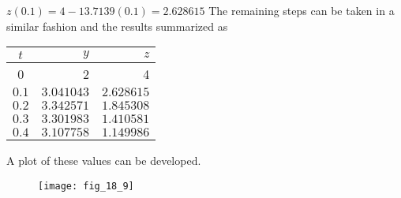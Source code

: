 \documentclass[../main.tex]{subfiles}
\begin{document}
\begin{enumerate}[label=\bfseries(\alph*)]
	\bigbreak
$z(0.1)=4-13.7139(0.1)=2.628615$
	\bigbreak
The remaining steps can be taken in a similar fashion and the results summarized as
	\bigbreak
\begin{tabular}{crr}
\hline
$t$ & $y$ & $z$ \\
\hline
0 & 2 & 4 \\
$0.1$ & $3.041043$ & $2.628615$ \\
$0.2$ & $3.342571$ & $1.845308$ \\
$0.3$ & $3.301983$ & $1.410581$ \\
$0.4$ & $3.107758$ & $1.149986$ \\
\hline
\end{tabular}
	\bigbreak
A plot of these values can be developed.
	\bigbreak
	\begin{figure}[H]
		\texttt{[image: fig\_18\_9]}
		\label{fig:fig_18_9}
	\end{figure}
\end{enumerate}
	\bigbreak
\end{document}
